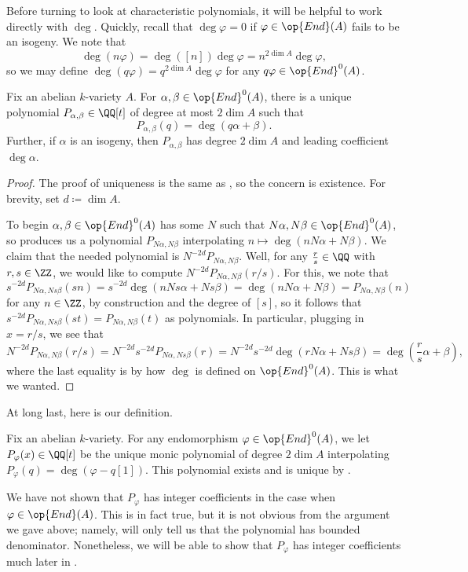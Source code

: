 \documentclass{amsart}
\begin{document}
Before turning to look at characteristic polynomials, it will be helpful to work directly with $\deg$. Quickly, recall that $\deg\varphi=0$ if $\varphi\in\op{End}(A)$ fails to be an isogeny. We note that
\[\deg(n\varphi)=\deg([n])\deg\varphi=n^{2\dim A}\deg\varphi,\]
so we may define $\deg(q\varphi)=q^{2\dim A}\deg\varphi$ for any $q\varphi\in\op{End}^0(A)$.
\begin{proposition} \label{prop:get-char-poly}
	Fix an abelian $k$-variety $A$. For $\alpha,\beta\in\op{End}^0(A)$, there is a unique polynomial $P_{\alpha,\beta}\in\QQ[t]$ of degree at most $2\dim A$ such that
	\[P_{\alpha,\beta}(q)=\deg(q\alpha+\beta).\]
	Further, if $\alpha$ is an isogeny, then $P_{\alpha,\beta}$ has degree $2\dim A$ and leading coefficient $\deg\alpha$.
\end{proposition}
\begin{proof}
	The proof of uniqueness is the same as , so the concern is existence. For brevity, set $d\coloneqq\dim A$.

	To begin $\alpha,\beta\in\op{End}^0(A)$ has some $N$ such that $N\alpha,N\beta\in\op{End}^0(A)$, so  produces us a polynomial $P_{N\alpha,N\beta}$ interpolating $n\mapsto\deg(nN\alpha+N\beta)$. We claim that the needed polynomial is $N^{-2d}P_{N\alpha,N\beta}$. Well, for any $\frac rs\in\QQ$ with $r,s\in\ZZ$, we would like to compute $N^{-2d}P_{N\alpha,N\beta}(r/s)$. For this, we note that
	\[s^{-2d}P_{N\alpha,Ns\beta}(sn)=s^{-2d}\deg(nNs\alpha+Ns\beta)=\deg(nN\alpha+N\beta)=P_{N\alpha,N\beta}(n)\]
	for any $n\in\ZZ$, by construction and the degree of $[s]$, so it follows that $s^{-2d}P_{N\alpha,Ns\beta}(st)=P_{N\alpha,N\beta}(t)$ as polynomials. In particular, plugging in $x=r/s$, we see that
	\[N^{-2d}P_{N\alpha,N\beta}(r/s)=N^{-2d}s^{-2d}P_{N\alpha,Ns\beta}(r)=N^{-2d}s^{-2d}\deg(rN\alpha+Ns\beta)=\deg\left(\frac rs\alpha+\beta\right),\]
	where the last equality is by how $\deg$ is defined on $\op{End}^0(A)$. This is what we wanted.
\end{proof}
At long last, here is our definition.
\begin{definition}
	Fix an abelian $k$-variety. For any endomorphism $\varphi\in\op{End}^0(A)$, we let $P_\varphi(x)\in\QQ[t]$ be the unique monic polynomial of degree $2\dim A$ interpolating $P_\varphi(q)=\deg(\varphi-q[1])$. This polynomial exists and is unique by .
\end{definition}
\begin{remark}
	We have not shown that $P_\varphi$ has integer coefficients in the case when $\varphi\in\op{End}(A)$. This is in fact true, but it is not obvious from the argument we gave above; namely,  will only tell us that the polynomial has bounded denominator. Nonetheless, we will be able to show that $P_\varphi$ has integer coefficients much later in .
\end{remark}
\end{document}
